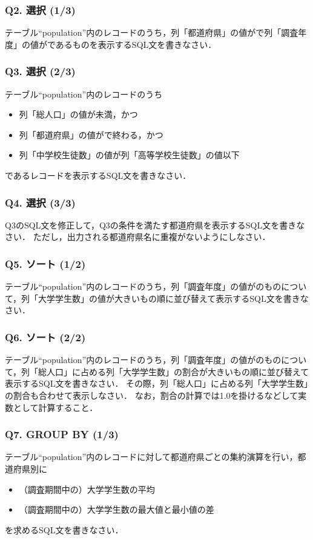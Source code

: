 \subsubsection{Q2. 選択 (1/3)}
テーブル``population''内のレコードのうち，列「都道府県」の値がで列「調査年度」の値がであるものを表示するSQL文を書きなさい．

\subsubsection{Q3. 選択 (2/3)}
テーブル``population''内のレコードのうち
\begin{itemize}
\item 列「総人口」の値が未満，かつ
\item 列「都道府県」の値がで終わる，かつ
\item 列「中学校生徒数」の値が列「高等学校生徒数」の値以下
\end{itemize}
であるレコードを表示するSQL文を書きなさい．

\subsubsection{Q4. 選択 (3/3)}
Q3のSQL文を修正して，Q3の条件を満たす都道府県を表示するSQL文を書きなさい．
ただし，出力される都道府県名に重複がないようにしなさい．

\subsubsection{Q5. ソート (1/2)}
テーブル``population''内のレコードのうち，列「調査年度」の値がのものについて，列「大学学生数」の値が大きいもの順に並び替えて表示するSQL文を書きなさい．

\subsubsection{Q6. ソート (2/2)}
テーブル``population''内のレコードのうち，列「調査年度」の値がのものについて，列「総人口」に占める列「大学学生数」の割合が大きいもの順に並び替えて表示するSQL文を書きなさい．
その際，列「総人口」に占める列「大学学生数」の割合も合わせて表示しなさい．
なお，割合の計算では1.0を掛けるなどして実数として計算すること．

\subsubsection{Q7. GROUP BY (1/3)}
テーブル``population''内のレコードに対して都道府県ごとの集約演算を行い，都道府県別に
\begin{itemize}
\item （調査期間中の）大学学生数の平均
\item （調査期間中の）大学学生数の最大値と最小値の差
\end{itemize}
を求めるSQL文を書きなさい．

